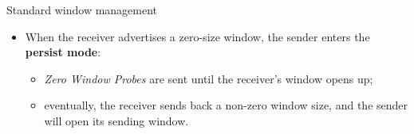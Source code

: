 \begin{frame}{Standard window management}
	\begin{itemize}
		\item When the receiver advertises a zero-size window,
		      the sender enters the \textbf{persist mode}:
		      \begin{itemize}
			    \item \textit{Zero Window Probes} are sent
				  until the receiver's window opens up;
			    \item eventually, the receiver sends back a non-zero window size,
				  and the sender will open its sending window.
		      \end{itemize}
	\end{itemize}
\end{frame}
